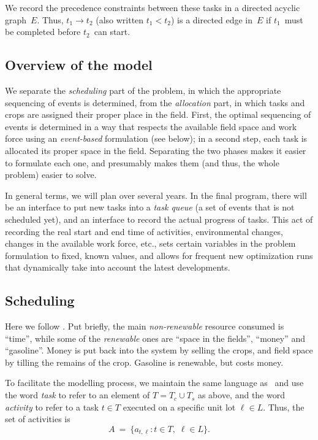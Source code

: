 \documentclass[11pt]{amsart}
\numberwithin{equation}{section}
\begin{document}
We record the precedence constraints between these tasks in a directed
acyclic graph~$E$. Thus, $t_1\longrightarrow t_2$ (also written
$t_1<t_2$) is a directed edge in~$E$ if $t_1$~must be completed
before $t_2$~can start.

\subsection{Overview of the model}


We separate the \emph{scheduling} part of the problem, in which the
appropriate sequencing of events is determined, from the
\emph{allocation} part, in which tasks and crops are assigned their
proper place in the field. First, the optimal sequencing of events is
determined in a way that respects the available field space and work
force using an \emph{event-based} formulation (see below); in a second
step, each task is allocated its proper space in the field. Separating
the two phases makes it easier to formulate each one, and presumably
makes them (and thus, the whole problem) easier to solve.

In general terms, we will plan over several years. In the final
program, there will be an interface to put new tasks into a \emph{task
  queue} (a set of events that is not scheduled yet), and an interface
to record the actual progress of tasks. This act of recording the real
start and end time of activities, environmental changes, changes in
the available work force, etc., sets certain variables in the problem
formulation to fixed, known values, and allows for frequent new
optimization runs that dynamically take into account the latest
developments.


\subsection{Scheduling}

Here we follow \cite{artigues-etal11}. Put briefly, the main
\emph{non-renewable} resource consumed is ``time'', while some of the
\emph{renewable} ones are ``space in the fields'', ``money'' and
``gasoline''. Money is put back into the system by selling the crops,
and field space by tilling the remains of the crop. Gasoline is
renewable, but costs money.

To facilitate the modelling process, we maintain the same language
as~\cite{artigues-etal11} and use the word \emph{task} to refer to an
element of $T=T_c\cup T_s$ as above, and the word \emph{activity} to
refer to a task $t\in T$ executed on a specific unit lot $\ell\in
L$. Thus, the set of activities is
\[
   A 
   \ = \  
   \big\{a_{t,\ell}:t\in T,\; \ell\in L\big\}.
\]
\end{document}
